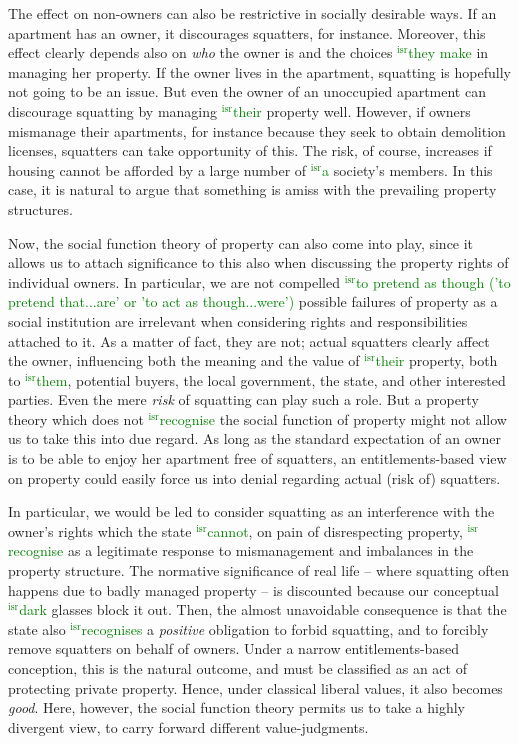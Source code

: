 \documentclass[12pt,a4paper]{book} %
\newcommand{\isr}[1]{\textcolor{green}{$^{\textrm{isr}}${#1}}}
\begin{document}
The effect on non-owners can also be restrictive in socially desirable ways. If an apartment has an owner, it discourages squatters, for instance. Moreover, this effect clearly depends also on {\it who} the owner is and the choices \isr{they make} in managing her property. If the owner lives in the apartment, squatting is hopefully not going to be an issue. But even the owner of an unoccupied apartment can discourage squatting by managing \isr{their} property well. However, if owners mismanage their apartments, for instance because they seek to obtain demolition licenses, squatters can take opportunity of this. The risk, of course, increases if housing cannot be afforded by a large number of \isr{a} society's members. In this case, it is natural to argue that something is amiss with the prevailing property structures.

Now, the social function theory of property can also come into play, since it allows us to attach significance to this also when discussing the property rights of individual owners.  In particular, we are not compelled \isr{to pretend as though ('to pretend that...are' or 'to act as though...were')} possible failures of property as a social institution are irrelevant when considering rights and responsibilities attached to it. As a matter of fact, they are not; actual squatters clearly affect the owner, influencing both the meaning and the value of \isr{their} property, both to \isr{them}, potential buyers, the local government, the state, and other interested parties. Even the mere {\it risk} of squatting can play such a role. But a property theory which does not \isr{recognise} the social function of property might not allow us to take this into due regard. As long as the standard expectation of an owner is to be able to enjoy her apartment free of squatters, an entitlements-based view on property could easily force us into denial regarding actual (risk of) squatters.

In particular, we would be led to consider squatting as an interference with the owner's rights which the state \isr{cannot}, on pain of disrespecting property, \isr{recognise} as a legitimate response to mismanagement and imbalances in the property structure. The normative significance of real life -- where squatting often happens due to badly managed property -- is discounted  because our conceptual \isr{dark} glasses block it out. Then, the almost unavoidable consequence is that the state also \isr{recognises} a {\it positive} obligation to forbid squatting, and to forcibly remove squatters on behalf of owners. Under a narrow entitlements-based conception, this is the natural outcome, and must be classified as an act of protecting private property. Hence, under classical liberal values, it also becomes {\it good}. Here, however, the social function theory permits us to take a highly divergent view, to carry forward different value-judgments.
\end{document}
